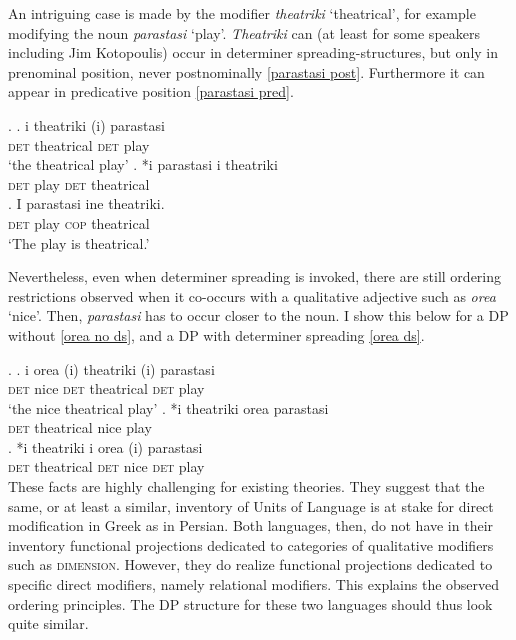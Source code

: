 An intriguing case is made by the modifier \textit{theatriki} `theatrical’, for example modifying the noun \textit{parastasi} `play’. \textit{Theatriki} can (at least for some speakers including Jim Kotopoulis) occur in determiner spreading-structures, but only in prenominal position, never postnominally \ref{parastasi post}. Furthermore it can appear in predicative position \ref{parastasi pred}.

\ex. \ag. i theatriki (i) parastasi\\
\textsc{det} theatrical \textsc{det} play\\
`the theatrical play’
\bg. *i parastasi i theatriki\\
\textsc{det} play \textsc{det} theatrical \label{parastasi post}\\
\cg. I parastasi ine theatriki.\\
\textsc{det} play \textsc{cop} theatrical\\
`The play is theatrical.’ \label{parastasi pred}

Nevertheless, even when determiner spreading is invoked, there are still ordering restrictions observed when it co-occurs with a qualitative adjective such as \textit{orea} `nice’. Then, \textit{parastasi} has to occur closer to the noun. I show this below for a DP without \ref{orea no ds}, and a DP with determiner spreading \ref{orea ds}. 

\ex. \ag. i orea (i) theatriki (i) parastasi\\
\textsc{det} nice \textsc{det} theatrical \textsc{det} play\\
`the nice theatrical play’
\bg. *i theatriki orea parastasi\\
\textsc{det} theatrical nice play \label{orea no ds}\\
\cg. *i theatriki i orea (i) parastasi\\
\textsc{det} theatrical \textsc{det} nice \textsc{det} play \label{orea ds}\\

These facts are highly challenging for existing theories. They suggest that the same, or at least a similar, inventory of Units of Language is at stake for direct modification in Greek as in  Persian. Both languages, then, do not have in their inventory functional projections dedicated to categories of qualitative modifiers such as \textsc{dimension}. However, they do realize functional projections dedicated to specific direct modifiers, namely relational modifiers. This explains the observed ordering principles. The DP structure for these two languages should thus look quite similar.  

